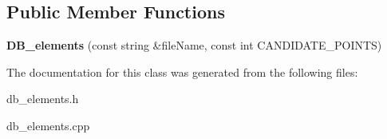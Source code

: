 \subsection*{Public Member Functions}
\begin{DoxyCompactItemize}
\item 
{\bfseries D\+B\+\_\+elements} (const string \&file\+Name, const int C\+A\+N\+D\+I\+D\+A\+T\+E\+\_\+\+P\+O\+I\+N\+TS)\hypertarget{class_d_b__elements_a1e648b5c8b7fcad6455e6d93e7530c4e}{}\label{class_d_b__elements_a1e648b5c8b7fcad6455e6d93e7530c4e}

\end{DoxyCompactItemize}


The documentation for this class was generated from the following files\+:\begin{DoxyCompactItemize}
\item 
db\+\_\+elements.\+h\item 
db\+\_\+elements.\+cpp\end{DoxyCompactItemize}
